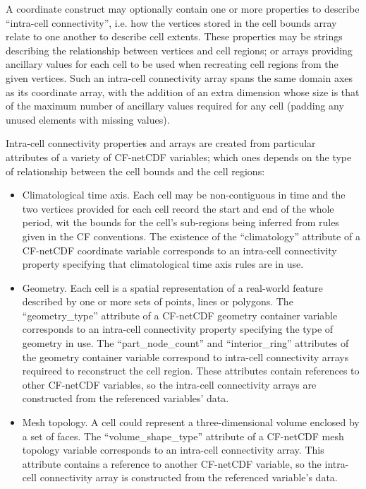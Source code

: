 
A coordinate construct may optionally contain one or more properties
to describe ``intra-cell connectivity'', i.e. how the vertices stored
in the cell bounds array relate to one another to describe cell
extents. These properties may be strings describing the relationship
between vertices and cell regions; or arrays providing ancillary
values for each cell to be used when recreating cell regions from the
given vertices. Such an intra-cell connectivity array spans the same
domain axes as its coordinate array, with the addition of an extra
dimension whose size is that of the maximum number of ancillary values
required for any cell (padding any unused elements with missing
values).

Intra-cell connectivity properties and arrays are created from
particular attributes of a variety of CF-netCDF variables; which ones
depends on the type of relationship between the cell bounds and the
cell regions:

\begin{itemize}

\item Climatological time axis. Each cell may be non-contiguous in
  time and the two vertices provided for each cell record the start
  and end of the whole period, wit the bounds for the cell's
  sub-regions being inferred from rules given in the CF
  conventions. The existence of the ``climatology'' attribute of a
  CF-netCDF coordinate variable corresponds to an intra-cell
  connectivity property specifying that climatological time axis rules
  are in use.
  
\item Geometry. Each cell is a spatial representation of a real-world
  feature described by one or more sets of points, lines or
  polygons. The ``geometry\_type'' attribute of a CF-netCDF geometry
  container variable corresponds to an intra-cell connectivity
  property specifying the type of geometry in use. The
  ``part\_node\_count'' and ``interior\_ring'' attributes of the
  geometry container variable correspond to intra-cell connectivity
  arrays requireed to reconstruct the cell region. These attributes
  contain references to other CF-netCDF variables, so the intra-cell
  connectivity arrays are constructed from the referenced variables'
  data.

\item Mesh topology. A cell could represent a three-dimensional volume
  enclosed by a set of faces. The ``volume\_shape\_type'' attribute of
  a CF-netCDF mesh topology variable corresponds to an intra-cell
  connectivity array. This attribute contains a reference to another
  CF-netCDF variable, so the intra-cell connectivity array is
  constructed from the referenced variable's data.
  
\end{itemize}

